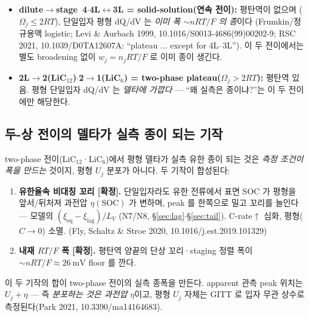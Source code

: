 \documentclass[11pt,a4paper]{article}
\newcommand{\eq}{\mathrm{eq}}
\begin{document}
\begin{itemize}[leftmargin=1.4em,itemsep=3pt]
\item \textbf{dilute$\to$stage~4$\cdot$4L$\leftrightarrow$3L = solid-solution(연속 전이):} 평탄역이 없으며
  ($\Omega_j\le2RT$), 단일입자 평형 dQ/dV 는 \emph{이미 폭 $\sim nRT/F$ 의 종}이다
  (Frumkin/정규용액 logistic; Levi \& Aurbach 1999, 10.1016/S0013-4686(99)00202-9;
  RSC 2021, 10.1039/D0TA12607A: ``plateau $\ldots$ except for 4L--3L'').
  이 두 전이에서는 별도 broadening 없이 $w_j=n_jRT/F$ 로 이미 종이 생긴다.
\item \textbf{2L$\to$2(LiC$_{12}$)$\cdot$2$\to$1(LiC$_6$) = two-phase plateau($\Omega_j>2RT$):} 평탄역 있음.
  평형 단일입자 dQ/dV 는 \emph{델타에 가깝다} — ``왜 실측은 종이냐?''는 이 두 전이에만 해당한다.
\end{itemize}

\subsection{두-상 전이의 델타가 실측 종이 되는 기작}\label{sec:broadening-mech}
two-phase 전이(LiC$_{12}$·LiC$_6$)에서 평형 델타가 실측 유한 종이 되는 것은
\emph{측정 조건이 폭을 만드는} 것이지, 평형 $U_j$ 분포가 아니다. 두 기작이 합성된다:

\begin{enumerate}[label=(\roman*),leftmargin=2.2em,itemsep=3pt]
\item \textbf{유한율속 비대칭 꼬리 [확정].} 단일입자라도 유한 전류에서 표면 SOC 가 평형을 앞서/뒤처져
  과전압 $\eta(\mathrm{SOC})$ 가 변하며, peak 를 한쪽으로 밀고 꼬리를 늘인다 — 모델의 $(\xi_\eq-\xi_{\mathrm{lag}})/L_V$
  (N7/N8, \S\ref{sec:lag}$\cdot$\S\ref{sec:tail}). C-rate$\uparrow$ 심화, 평형($C\to0$) 소멸.
  (Fly, Schaltz \& Stroe 2020, 10.1016/j.est.2019.101329)
\item \textbf{내재 $RT/F$ 폭 [확정].} 평탄역 양끝의 단상 꼬리·staging 정렬 폭이
  $\sim nRT/F\!\approx\!26\ \mathrm{mV}$ floor 를 깐다.
\end{enumerate}

\noindent
이 두 기작의 합이 two-phase 전이의 실측 종폭을 만든다.
apparent 관측 peak 위치는 $U_j+\eta$ — 즉 \emph{분포하는 것은 과전압 $\eta$}이고,
평형 $U_j$ 자체는 GITT 로 입자 무관 상수로 측정된다(Park 2021, 10.3390/ma14164683).
\end{document}
